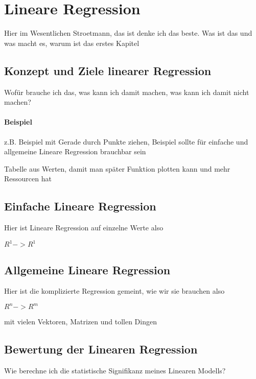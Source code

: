 \section{Lineare Regression}
\label{sec:LineareRegression}
Hier im Wesentlichen Stroetmann, das ist denke ich das beste. 
Was ist das und was macht es, warum ist das erstes Kapitel
\subsection{Konzept und Ziele linearer Regression}
Wofür brauche ich das, was kann ich damit machen, was kann ich damit nicht machen?
\paragraph{Beispiel}
z.B. Beispiel mit Gerade durch Punkte ziehen, Beispiel sollte für einfache und allgemeine Lineare Regression brauchbar sein 

Tabelle aus Werten, damit man später Funktion plotten kann und mehr Ressourcen hat 

\subsection{Einfache Lineare Regression}
Hier ist Lineare Regression auf einzelne Werte also 

$R^1 -> R^1$

\subsection{Allgemeine Lineare Regression}
Hier ist die komplizierte Regression gemeint, wie wir sie brauchen also

$R^n -> R^m$

mit vielen Vektoren, Matrizen und tollen Dingen

\subsection{Bewertung der Linearen Regression}
Wie berechne ich die statistische Signifikanz meines Linearen Modells?